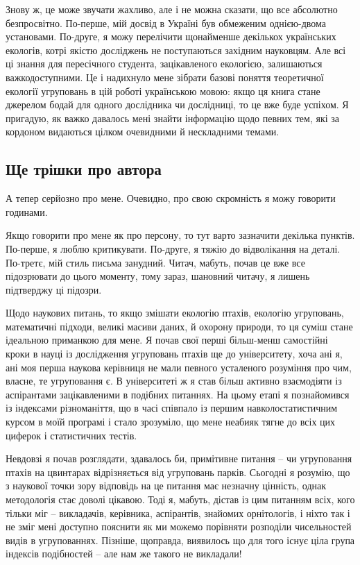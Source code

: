 \documentclass[
  11pt,
]{book}
\begin{document}
Знову ж, це може звучати жахливо, але і не можна сказати, що все
абсолютно безпросвітно. По-перше, мій досвід в Україні був обмеженим
однією-двома установами. По-друге, я можу перелічити щонайменше
декількох українських екологів, котрі якістю досліджень не поступаються
західним науковцям. Але всі ці знання для пересічного студента,
зацікавленого екологією, залишаються важкодоступними. Це і надихнуло
мене зібрати базові поняття теоретичної екології угруповань в цій роботі
українською мовою: якщо ця книга стане джерелом бодай для одного
дослідника чи дослідниці, то це вже буде успіхом. Я пригадую, як важко
давалось мені знайти інформацію щодо певних тем, які за кордоном
видаються цілком очевидними й нескладними темами.

\subsection{Ще трішки про автора}\label{more-about-author}

А тепер серйозно про мене. Очевидно, про свою скромність я можу говорити
годинами.

Якщо говорити про мене як про персону, то тут варто зазначити декілька
пунктів. По-перше, я люблю критикувати. По-друге, я тяжію до
відволікання на деталі. По-третє, мій стиль письма занудний. Читач,
мабуть, почав це вже все підозрювати до цього моменту, тому зараз,
шановний читачу, я лишень підтверджу ці підозри.

Щодо наукових питань, то якщо змішати екологію птахів, екологію
угруповань, математичні підходи, великі масиви даних, й охорону природи,
то ця суміш стане ідеальною приманкою для мене. Я почав свої перші
більш-менш самостійні кроки в науці із дослідження угруповань птахів ще
до університету, хоча ані я, ані моя перша наукова керівниця не мали
певного усталеного розуміння про чим, власне, те угруповання є. В
університеті ж я став більш активно взаємодіяти із аспірантами
зацікавленими в подібних питаннях. На цьому етапі я познайомився із
індексами різноманіття, що в часі співпало із першим навколостатистичним
курсом в моїй програмі і стало зрозуміло, що мене неабияк тягне до всіх
цих циферок і статистичних тестів.

Невдовзі я почав розглядати, здавалось би, примітивне питання -- чи
угруповання птахів на цвинтарах відрізняється від угруповань парків.
Сьогодні я розумію, що з наукової точки зору відповідь на це питання має
незначну цінність, однак методологія стає доволі цікавою. Тоді я,
мабуть, дістав із цим питанням всіх, кого тільки міг -- викладачів,
керівника, аспірантів, знайомих орнітологів, і ніхто так і не зміг мені
доступно пояснити як ми можемо порівняти розподіли чисельностей видів в
угрупованнях. Пізніше, щоправда, виявилось що для того існує ціла група
індексів подібностей -- але нам же такого не викладали!
\end{document}
